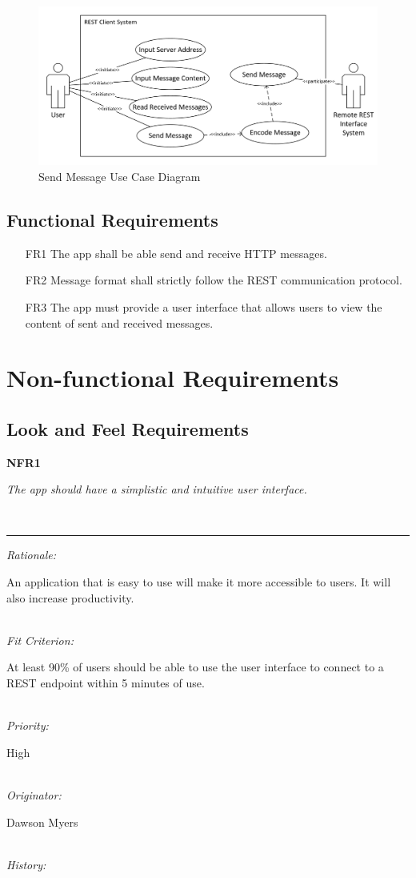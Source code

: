 \documentclass[12pt, titlepage]{article}
\newcommand{\pbox}[1]{\parbox[t]{.85\linewidth}{#1}
}
\newcommand{\myline}{%
	\kern1pt %
	\hrule height 0.8pt
	\kern3pt %
}
\newcommand{\requirement}[7]{

	\noindent
	\vspace{5pt}
	\parbox{\linewidth}{
		\fontsize{10pt}{5pt}\selectfont
		\noindent\textbf{#1} \hspace{26pt}\pbox{\textit{#2}} \\
		\myline
		\textit{Rationale:}	\hspace{10pt} \pbox{#3} \\
		\textit{Fit Criterion:} \pbox{#4} \\
		\textit{Priority:} \hspace{18pt} \pbox{#5} \\
		\textit{Originator:} \hspace{7pt} \pbox{#6} \\
		\textit{History:} \hspace{25pt}{#7} \\
}}
\newcommand{\descWidth}{5.13in}
\newcommand{\pbox}[1]{\parbox[t]{\descWidth}{#1}}
\newcommand{\myline}{%
	\kern1pt %
	\hrule height 0.8pt
	\kern3pt %
}
\begin{document}
\begin{center}
	\begin{figure}[h!]
		\includegraphics[width=0.8\linewidth, center]{images/srs-use-case-send-msg}
		\caption{Send Message Use Case Diagram}
		\label{image:usecase}
	\end{figure}
\end{center}


\subsection{Functional Requirements}
\begin{enumerate}
	\item[FR1] The app shall be able send and receive HTTP messages.
	\item[FR2] Message format shall strictly follow the REST communication protocol.
	\item[FR3] The app must provide a user interface that allows users to view the content of sent and received messages.
	
\end{enumerate}
\section{Non-functional Requirements}


\subsection{Look and Feel Requirements}
\requirement{NFR1}{The app should have a simplistic and intuitive user interface.}
{An application that is easy to use will make it more accessible to users. It will also increase productivity.}
{At least 90\% of users should be able to use the user interface to connect to a REST endpoint within 5 minutes of use.}{High}{Dawson Myers}{October 6, 2017}
\end{document}
